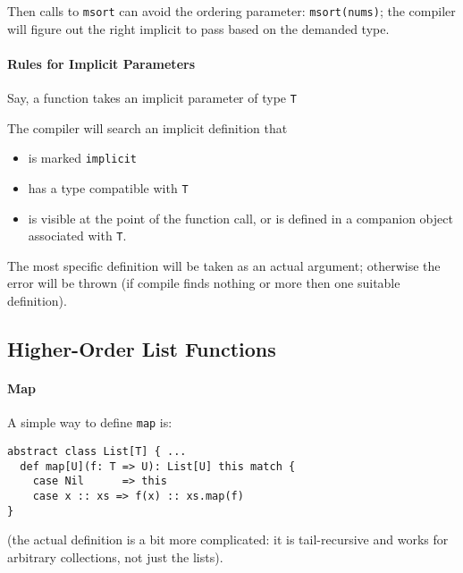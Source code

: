 \documentclass{scrartcl}
\begin{document}
Then calls to \lstinline|msort| can avoid the ordering parameter:
\lstinline|msort(nums)|; the compiler will figure out the right implicit to pass
based on the demanded type.

\paragraph{Rules for Implicit Parameters}

Say, a function takes an implicit parameter of type \lstinline|T|

The compiler will search an implicit definition that
\begin{itemize}
\item is marked \lstinline|implicit|
\item has a type compatible with \lstinline|T|
\item is visible at the point of the function call, or is defined in a companion
  object associated with \lstinline|T|.
\end{itemize}

The most specific definition will be taken as an actual argument; otherwise the
error will be thrown (if compile finds nothing or more then one suitable
definition).

\subsection{Higher-Order List Functions}
\label{sec:HigherOrderListFunctions}

\paragraph{Map}
A simple way to define \lstinline|map| is:
\begin{lstlisting}
abstract class List[T] { ...
  def map[U](f: T => U): List[U] this match {
    case Nil      => this
    case x :: xs => f(x) :: xs.map(f)
}
\end{lstlisting}
(the actual definition is a bit more complicated: it is tail-recursive and works
for arbitrary collections, not just the lists).
\end{document}

